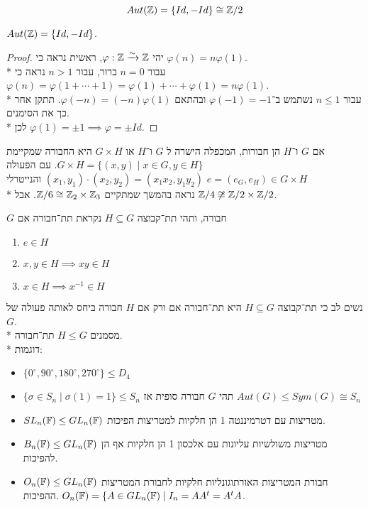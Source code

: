 \[
	Aut(\mathbb{Z}) = \{Id, -Id\} \cong \mathbb{Z}/2
\]
\begin{proposition}
	$Aut(\mathbb{Z}) = \{Id, -Id\}$.
\end{proposition}
\begin{proof}
	יהי $\varphi : \mathbb{Z} \xrightarrow{\sim} \mathbb{Z}$, ראשית נראה כי $\varphi(n) = n\varphi(1)$. \\*
	עבור $n = 0$ ברור, עבור $ n > 1$ נראה כי $\varphi(n) = \varphi(1 + \cdots + 1) = \varphi(1) + \cdots + \varphi(1) = n \varphi(1)$. \\*
	עבור $n \le 1$ נשתמש ב־$\varphi(-1) = -1$ ובהתאם $\varphi(-n) = (-n)\varphi(1)$. תתקן אחר כך את הסימנים. \\*
	לכן $\varphi(1) = \pm 1 \implies \varphi = \pm Id$.
\end{proof}
\begin{definition}
	אם $G$ ו־$H$ הן חבורות, המכפלה הישרה ל $G$ ו־$H$ או $G \times H$ היא החבורה שמקיימת $G \times H = \{ (x, y) \mid x \in G, y \in H \}$.
	עם הפעולה $(x_1, y_1) \cdot (x_2, y_2) = (x_1 x_2, y_1 y_2)$ והנייטרלי $e = (e_G, e_H) \in G \times H$ \\*
	נראה בהמשך שמתקיים $\mathbb{Z}/6 \cong \mathbb{Z}_2 \times \mathbb{Z}_3$. אבל $\mathbb{Z}/4 \not\cong \mathbb{Z}/2 \times \mathbb{Z}/2$.
\end{definition}
\begin{definition}[תת־חבורה]
	$G$ חבורה, ותהי תת־קבוצה $H \subseteq G$ נקראת תת־חבורה אם
	\begin{enumerate}
		\item $e \in H$
		\item $x, y \in H \implies xy \in H$
		\item $x \in H \implies x^{-1} \in H$
	\end{enumerate}
\end{definition}
נשים לב  כי תת־קבוצה $H \subseteq G$ היא תת־חבורה אם ורק אם $H$ חבורה ביחס לאותה פעולה של $G$. \\*
מסמנים $H \le G$ תת־חבורה. \\*
דוגמות:
\begin{itemize}
	\item $\{ 0^\circ, 90^\circ, 180^\circ, 270^\circ \} \le D_4$
	\item $\{ \sigma \in S_n \mid \sigma(1) = 1 \} \le S_n$
		\subitem{-} תהי $G$ חבורה סופית אז $Aut(G) \le Sym(G) \cong S_n$
	\item $SL_n(\mathbb{F}) \le GL_n(\mathbb{F})$ מטריצות עם דטרמיננטה 1 הן חלקיות למטריצות הפיכות.
	\item $B_n(\mathbb{F}) \le GL_n(\mathbb{F})$ מטריצות משולשיות עליונות עם אלכסון 1 הן חלקיות אף הן להפיכות.
	\item $O_n(\mathbb{F}) \le GL_n(\mathbb{F})$ חבורת המטריצות האורתוגונליות חלקיות לחבורת המטריצות ההפיכות. $O_n(\mathbb{F}) = \{ A \in GL_n(\mathbb{F}) \mid I_n = AA^t = A^t A$.
\end{itemize}
